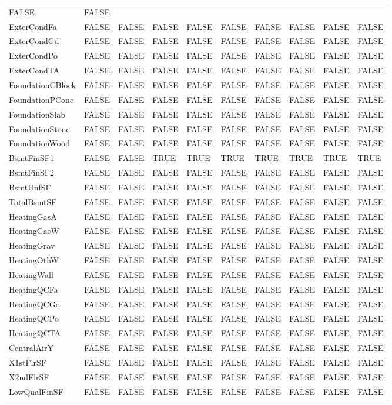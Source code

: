 \documentclass[]{article}
\begin{document}
\begin{longtable}[]{@{}llllllllll@{}}
FALSE & FALSE\tabularnewline
ExterCondFa & FALSE & FALSE & FALSE & FALSE & FALSE & FALSE & FALSE &
FALSE & FALSE\tabularnewline
ExterCondGd & FALSE & FALSE & FALSE & FALSE & FALSE & FALSE & FALSE &
FALSE & FALSE\tabularnewline
ExterCondPo & FALSE & FALSE & FALSE & FALSE & FALSE & FALSE & FALSE &
FALSE & FALSE\tabularnewline
ExterCondTA & FALSE & FALSE & FALSE & FALSE & FALSE & FALSE & FALSE &
FALSE & FALSE\tabularnewline
FoundationCBlock & FALSE & FALSE & FALSE & FALSE & FALSE & FALSE & FALSE
& FALSE & FALSE\tabularnewline
FoundationPConc & FALSE & FALSE & FALSE & FALSE & FALSE & FALSE & FALSE
& FALSE & FALSE\tabularnewline
FoundationSlab & FALSE & FALSE & FALSE & FALSE & FALSE & FALSE & FALSE &
FALSE & FALSE\tabularnewline
FoundationStone & FALSE & FALSE & FALSE & FALSE & FALSE & FALSE & FALSE
& FALSE & FALSE\tabularnewline
FoundationWood & FALSE & FALSE & FALSE & FALSE & FALSE & FALSE & FALSE &
FALSE & FALSE\tabularnewline
BsmtFinSF1 & FALSE & FALSE & TRUE & TRUE & TRUE & TRUE & TRUE & TRUE &
TRUE\tabularnewline
BsmtFinSF2 & FALSE & FALSE & FALSE & FALSE & FALSE & FALSE & FALSE &
FALSE & FALSE\tabularnewline
BsmtUnfSF & FALSE & FALSE & FALSE & FALSE & FALSE & FALSE & FALSE &
FALSE & FALSE\tabularnewline
TotalBsmtSF & FALSE & FALSE & FALSE & FALSE & FALSE & FALSE & FALSE &
FALSE & FALSE\tabularnewline
HeatingGasA & FALSE & FALSE & FALSE & FALSE & FALSE & FALSE & FALSE &
FALSE & FALSE\tabularnewline
HeatingGasW & FALSE & FALSE & FALSE & FALSE & FALSE & FALSE & FALSE &
FALSE & FALSE\tabularnewline
HeatingGrav & FALSE & FALSE & FALSE & FALSE & FALSE & FALSE & FALSE &
FALSE & FALSE\tabularnewline
HeatingOthW & FALSE & FALSE & FALSE & FALSE & FALSE & FALSE & FALSE &
FALSE & FALSE\tabularnewline
HeatingWall & FALSE & FALSE & FALSE & FALSE & FALSE & FALSE & FALSE &
FALSE & FALSE\tabularnewline
HeatingQCFa & FALSE & FALSE & FALSE & FALSE & FALSE & FALSE & FALSE &
FALSE & FALSE\tabularnewline
HeatingQCGd & FALSE & FALSE & FALSE & FALSE & FALSE & FALSE & FALSE &
FALSE & FALSE\tabularnewline
HeatingQCPo & FALSE & FALSE & FALSE & FALSE & FALSE & FALSE & FALSE &
FALSE & FALSE\tabularnewline
HeatingQCTA & FALSE & FALSE & FALSE & FALSE & FALSE & FALSE & FALSE &
FALSE & FALSE\tabularnewline
CentralAirY & FALSE & FALSE & FALSE & FALSE & FALSE & FALSE & FALSE &
FALSE & FALSE\tabularnewline
X1stFlrSF & FALSE & FALSE & FALSE & FALSE & FALSE & FALSE & FALSE &
FALSE & FALSE\tabularnewline
X2ndFlrSF & FALSE & FALSE & FALSE & FALSE & FALSE & FALSE & FALSE &
FALSE & FALSE\tabularnewline
LowQualFinSF & FALSE & FALSE & FALSE & FALSE & FALSE & FALSE & FALSE &
FALSE & FALSE\tabularnewline

\end{longtable}
\end{document}
